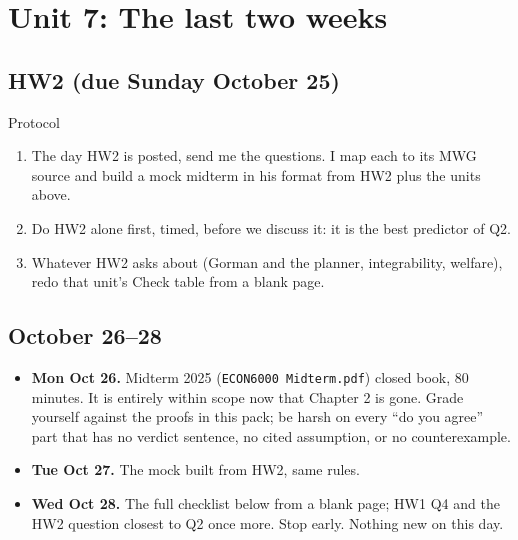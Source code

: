 \documentclass[11pt]{article}
\begin{document}
\clearpage
\section{Unit 7: The last two weeks}
\subsection{HW2 (due Sunday October 25)}
\begin{todo}{Protocol}
\begin{enumerate}
\item The day HW2 is posted, send me the questions. I map each to its MWG source and build a mock midterm in his format from HW2 plus the units above.
\item Do HW2 alone first, timed, before we discuss it: it is the best predictor of Q2.
\item Whatever HW2 asks about (Gorman and the planner, integrability, welfare), redo that unit's Check table from a blank page.
\end{enumerate}
\end{todo}

\subsection{October 26--28}
\begin{itemize}
\item \textbf{Mon Oct 26.} Midterm 2025 (\texttt{ECON6000 Midterm.pdf}) closed book, 80 minutes. It is entirely within scope now that Chapter 2 is gone. Grade yourself against the proofs in this pack; be harsh on every ``do you agree'' part that has no verdict sentence, no cited assumption, or no counterexample.
\item \textbf{Tue Oct 27.} The mock built from HW2, same rules.
\item \textbf{Wed Oct 28.} The full checklist below from a blank page; HW1 Q4 and the HW2 question closest to Q2 once more. Stop early. Nothing new on this day.
\end{itemize}
\end{document}
